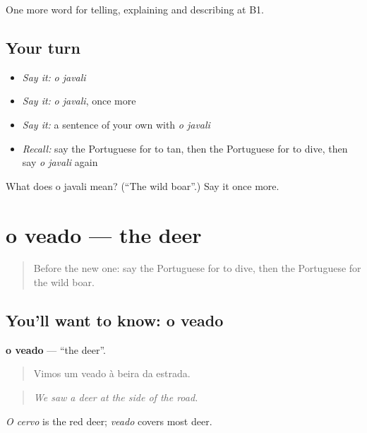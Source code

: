\begin{grammarlens}[title={What you've built}]
One more word for telling, explaining and describing at B1.
\end{grammarlens}

\subsection*{Your turn}
\begin{itemize}
\raggedright
  \item \emph{Say it:} \emph{o javali}
  \item \emph{Say it:} \emph{o javali}, once more
  \item \emph{Say it:} a sentence of your own with \emph{o javali}
  \item \emph{Recall:} say the Portuguese for to tan, then the Portuguese for to dive, then say \emph{o javali} again
\end{itemize}

\begin{tcolorbox}[breakable,colback=teal!4,colframe=teal!35!black,title={Before you move on}]
What does o javali mean? (\textquotedblleft{}The wild boar\textquotedblright{}.) Say it once more.
\end{tcolorbox}
\section[o veado]{o veado — the deer}

\label{lesson:PT-C460-veado}



\begin{quote}
Before the new one: say the Portuguese for to dive, then the Portuguese for the wild boar.
\end{quote}

\subsection*{You'll want to know: o veado}
\textbf{o veado} — \textquotedblleft{}the deer\textquotedblright{}.

\begin{quote}
Vimos um veado à beira da estrada.
\end{quote}

\begin{quote}
\emph{We saw a deer at the side of the road.}
\end{quote}

\emph{O cervo} is the red deer; \emph{veado} covers most deer.

